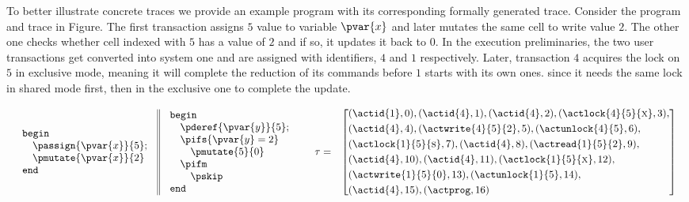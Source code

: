 To better illustrate concrete traces we provide an example program with its corresponding formally generated trace. Consider the program and trace in Figure. The first transaction assigns $5$ value to variable $\pvar{x}$ and later mutates the same cell to write value $2$. The other one checks whether cell indexed with $5$ has a value of $2$ and if so, it updates it back to $0$. In the execution preliminaries, the two user transactions get converted into system one and are assigned with identifiers, $4$ and $1$ respectively. Later, transaction $4$ acquires the lock on $5$ in exclusive mode, meaning it will complete the reduction of its commands before $1$ starts with its own ones. since it needs the same lock in shared mode first, then in the exclusive one to complete the update.

\[
	\begin{array}{l r}
		\begin{array}{l || l}
			\begin{array}{l}
				\mathtt{begin} \\
					\quad \passign{\pvar{x}}{5} ; \\
					\quad \pmutate{\pvar{x}}{2} \\
				\mathtt{end}
			\end{array}
				&
			\begin{array}{l}
				\mathtt{begin} \\
					\quad \pderef{\pvar{y}}{5} ; \\
					\quad \pifs{\pvar{y} = 2} \\
					\quad \quad \pmutate{5}{0} \\
					\quad \pifm \\
					\quad \quad \pskip \\
				\mathtt{end}
			\end{array}
		\end{array}
		&
		\begin{array}{r l}
			\tau =
			&
			\left[
			\begin{aligned}
				&(\actid{1}, 0), (\actid{4}, 1), (\actid{4}, 2), (\actlock{4}{5}{\textsc{x}}, 3), \\
				&(\actid{4}, 4), (\actwrite{4}{5}{2}, 5), (\actunlock{4}{5}, 6), \\
				&(\actlock{1}{5}{\textsc{s}}, 7), (\actid{4}, 8), (\actread{1}{5}{2}, 9), \\
				&(\actid{4}, 10), (\actid{4}, 11), (\actlock{1}{5}{\textsc{x}}, 12), \\
				&(\actwrite{1}{5}{0}, 13),  (\actunlock{1}{5}, 14), \\
				&(\actid{4}, 15), (\actprog, 16)
			\end{aligned}
			\right]
		\end{array}
	\end{array}
\]

